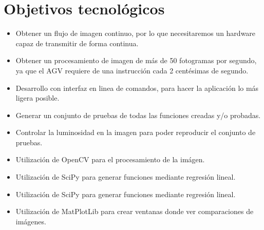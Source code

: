 \section{Objetivos tecnológicos}
\begin{itemize}
	\item Obtener un flujo de imagen continuo, por lo que necesitaremos un hardware capaz de transmitir  de forma continua.
	
	\item Obtener un procesamiento de imagen de más de 50 fotogramas por segundo, ya que el AGV requiere de una instrucción cada 2 centésimas de segundo.
	
	\item Desarrollo con interfaz en linea de comandos, para hacer la aplicación lo más ligera posible.
	
	\item Generar un conjunto de pruebas de todas las funciones creadas y/o probadas.
	
	\item Controlar la luminosidad en la imagen para poder reproducir el conjunto de pruebas.
	
	\item Utilización de OpenCV para el procesamiento de la imágen.
	
	\item Utilización de SciPy para generar funciones mediante regresión lineal.
	
	\item Utilización de SciPy para generar funciones mediante regresión lineal. 
	
	\item Utilización de MatPlotLib para crear ventanas donde ver comparaciones de imágenes.
\end{itemize}
